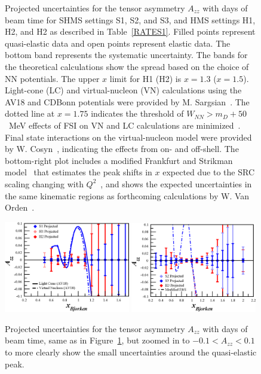 \begin{figure}
\begin{center}
\caption{\label{PROJ}Projected uncertainties for the tensor asymmetry $A_{zz}$ with \productiondays days of beam time for SHMS settings S1, S2, and S3, and HMS settings H1, H2, and H2 as described in Table~\ref{RATES1}. Filled points represent quasi-elastic data and open points represent elastic data. The bottom band represents the systematic uncertainty. The bands for the theoretical calculations show the spread based on the choice of NN potentials. The upper $x$ limit for H1 (H2) is $x=1.3$ ($x=1.5$). Light-cone (LC) and virtual-nucleon (VN) calculations using the AV18 and CDBonn potentials were provided by M. Sargsian~\cite{Sargsian:2014fla}. The dotted line at $x=1.75$ indicates the threshold of $W_{NN}>m_D+50$~MeV effects of FSI on VN and LC calculations are minimized~\cite{Frankfurt:1993sp}. Final state interactions on the virtual-nucleon model were provided by W. Cosyn~\cite{cosyn-convo}, indicating the effects from on- and off-shell. The bottom-right plot includes a modified Frankfurt and Strikman model~\cite{Frankfurt:1988nt} that estimates the peak shifts in $x$ expected due to the SRC scaling changing with $Q^2$~\cite{Frankfurt:2008zv}, and shows the expected uncertainties in the same kinematic regions as forthcoming calculations by W. Van Orden~\cite{vanorden-convo}.
}
\end{center}
\end{figure}

\begin{figure}
\begin{center}
\includegraphics[width=0.49\textwidth]{figs/Azz_S1_H1_H2_zoom.eps} 
\includegraphics[width=0.49\textwidth]{figs/Azz_S2_H3_S3_zoom.eps} 
\caption{\label{PROJ-zoom}Projected uncertainties for the tensor asymmetry $A_{zz}$ with \productiondays days of beam time, same as in Figure~\ref{PROJ}, but zoomed in to $-0.1<A_{zz}<0.1$ to more clearly show the small uncertainties around the quasi-elastic peak.
}
\end{center}
\end{figure}

